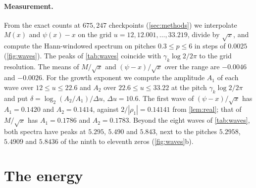 \documentclass[11pt]{article}
\theoremstyle{definition}\newtheorem{definition}[theorem]{Definition}
\theoremstyle{remark}\newtheorem{remark}[theorem]{Remark}
\begin{document}
\paragraph{Measurement.} From the exact counts at $675{,}247$ checkpoints (\cref{sec:methods}) we interpolate $M(x)$ and $\psi(x)-x$ on the grid $u=12,12.001,\dots,33.219$, divide by $\sqrt x$, and compute the Hann-windowed spectrum on pitches $0.3\le p\le6$ in steps of $0.0025$ (\cref{fig:waves}). The peaks of \cref{tab:waves} coincide with $\gamma_k\log2/2\pi$ to the grid resolution. The means of $M/\sqrt x$ and $(\psi-x)/\sqrt x$ over the range are $-0.0046$ and $-0.0026$. For the growth exponent we compute the amplitude $A_1$ of each wave over $12\le u\le22.6$ and $A_2$ over $22.6\le u\le33.22$ at the pitch $\gamma_k\log2/2\pi$ and put $\delta=\log_2(A_2/A_1)/\Delta u$, $\Delta u=10.6$. The first wave of $(\psi-x)/\sqrt x$ has $A_1=0.1420$ and $A_2=0.1414$, against $2/|\rho_1|=0.14141$ from \cref{lem:real}; that of $M/\sqrt x$ has $A_1=0.1786$ and $A_2=0.1783$. Beyond the eight waves of \cref{tab:waves}, both spectra have peaks at $5.295$, $5.490$ and $5.843$, next to the pitches $5.2958$, $5.4909$ and $5.8436$ of the ninth to eleventh zeros (\cref{fig:waves}b).

\section{The energy}\label{sec:energy}
\end{document}
